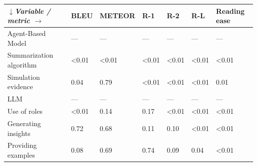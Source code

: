 \begin{tabular}{|l|l|l|l|l|l|l|}
\hline
\textit{$\downarrow$Variable / metric $\rightarrow$} & BLEU & METEOR & R-1 & R-2 & R-L & Reading ease \\
 \hline
 Agent-Based Model & — & — & — & — & — & — \\
 \hline
 Summarization algorithm & \textless{}0.01 & \textless{}0.01 & \textless{}0.01 & \textless{}0.01 & \textless{}0.01 & \textless{}0.01 \\
 \hline
 Simulation evidence & 0.04 & 0.79 & \textless{}0.01 & \textless{}0.01 & \textless{}0.01 & 0.01 \\
 \hline
 LLM & — & — & — & — & — & — \\
 \hline
 Use of roles & \textless{}0.01 & 0.14 & 0.17 & \textless{}0.01 & \textless{}0.01 & \textless{}0.01 \\
 \hline
 Generating insights & 0.72 & 0.68 & 0.11 & 0.10 & \textless{}0.01 & \textless{}0.01 \\
 \hline
 Providing examples & 0.08 & 0.69 & 0.74 & 0.09 & 0.04 & \textless{}0.01 \\
\hline
\end{tabular}
